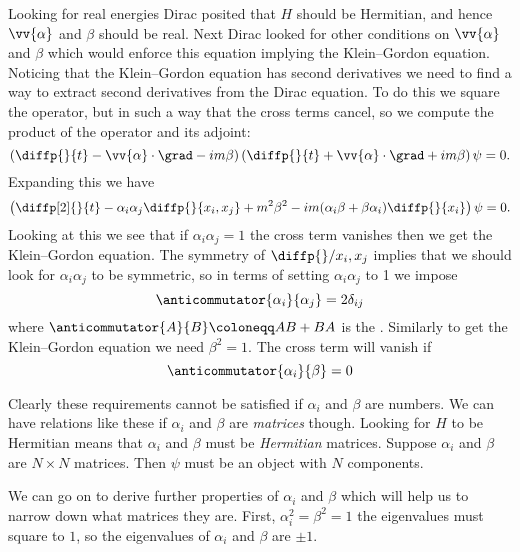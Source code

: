 \documentclass[fleqn]{NotesClass}
\begin{document}
    Looking for real energies Dirac posited that \(H\) should be Hermitian, and hence \(\vv{\alpha}\) and \(\beta\) should be real.
    Next Dirac looked for other conditions on \(\vv{\alpha}\) and \(\beta\) which would enforce this equation implying the Klein--Gordon equation.
    Noticing that the Klein--Gordon equation has second derivatives we need to find a way to extract second derivatives from the Dirac equation.
    To do this we square the operator, but in such a way that the cross terms cancel, so we compute the product of the operator and its adjoint:
    \begin{equation}
        \left( \diffp{}{t} - \vv{\alpha} \cdot \grad - im\beta \right) \left( \diffp{}{t} + \vv{\alpha} \cdot \grad + im\beta \right)\psi = 0.
    \end{equation}
    Expanding this we have
    \begin{equation}
        \left( \diffp[2]{}{t} - \alpha_i\alpha_j \diffp{}{x_i, x_j} + m^2\beta^2 - im(\alpha_i \beta + \beta \alpha_i) \diffp{}{x_i} \right)\psi = 0.
    \end{equation}
    Looking at this we see that if \(\alpha_i\alpha_j = 1\) the cross term vanishes then we get the Klein--Gordon equation.
    The symmetry of \(\diffp{}/{x_i, x_j}\) implies that we should look for \(\alpha_i\alpha_j\) to be symmetric, so in terms of setting \(\alpha_i\alpha_j\) to 1 we impose
    \begin{equation}
        \anticommutator{\alpha_i}{\alpha_j} = 2\delta_{ij}
    \end{equation}
    where \(\anticommutator{A}{B} \coloneqq AB + BA\) is the .
    Similarly to get the Klein--Gordon equation we need \(\beta^2 = 1\).
    The cross term will vanish if
    \begin{equation}
        \anticommutator{\alpha_i}{\beta} = 0
    \end{equation}
    
    Clearly these requirements cannot be satisfied if \(\alpha_i\) and \(\beta\) are numbers.
    We can have relations like these if \(\alpha_i\) and \(\beta\) are \emph{matrices} though.
    Looking for \(H\) to be Hermitian means that \(\alpha_i\) and \(\beta\) must be \emph{Hermitian} matrices.
    Suppose \(\alpha_i\) and \(\beta\) are \(N \times  N\) matrices.
    Then \(\psi\) must be an object with \(N\) components.
    
    We can go on to derive further properties of \(\alpha_i\) and \(\beta\) which will help us to narrow down what matrices they are.
    First, \(\alpha_i^2 = \beta^2 = 1\) the eigenvalues must square to \(1\), so the eigenvalues of \(\alpha_i\) and \(\beta\) are \(\pm 1\).
    
\end{document}
